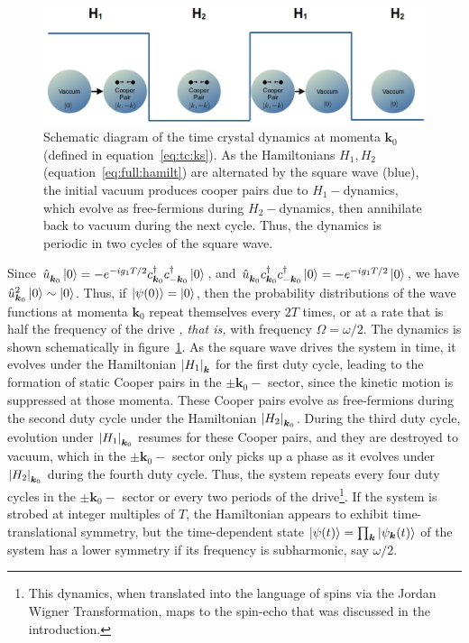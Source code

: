 \documentclass[preprint,5p,times,twocolumn]{elsarticle}
\newcommand{\bmk}{\bm{k}}
\begin{document}
\begin{figure}[t!]
    \centering
    \includegraphics[scale=3.5]{fig1_subharmonic.png}
    \caption{Schematic diagram of the time crystal dynamics at momenta $\bmk_0$ (defined in  equation~\ref{eq:tc:ks}). As the Hamiltonians $H_1, H_2$ (equation~\ref{eq:full:hamilt}) are alternated by the square wave (blue), the initial vacuum produces cooper pairs due to $H_1-$dynamics, which evolve as free-fermions during $H_2-$dynamics, then annihilate back to vacuum during the next cycle. Thus, the dynamics is periodic in two cycles of the square wave.}
    \label{fig:scm:tc}
\end{figure}
Since $\hat{u}^{\;}_{\bmk_0}\ket{0} = -e^{-ig_1T/2} c^\dagger_{\bmk_0}c^\dagger_{-\bmk_0}\ket{0}$, and $\hat{u}^{\;}_{\bmk_0}c^\dagger_{\bmk_0}c^\dagger_{-\bmk_0}\ket{0} = -e^{-ig_1T/2}\ket{0}$, we have $\hat{u}^2_{\bmk_0}\ket{0}\sim\ket{0}$. Thus, if $\ket{\psi(0)}=\ket{0}$, then the probability distributions of the wave functions at momenta $\bmk_0$ repeat themselves every $2T$ times, or at a rate that is half the frequency of the drive \textit{, that is,} with frequency $\Omega = \omega/2$.  The dynamics is shown schematically in figure~\ref{fig:scm:tc}. As the square wave drives the system in time, it evolves under the Hamiltonian $\vqty{H_1}_{\bmk}$ for the first duty cycle, leading to the formation of static Cooper pairs in the $\pm\bmk_0-$ sector, since the kinetic motion is suppressed at those momenta. These Cooper pairs evolve as free-fermions during the second duty cycle under the Hamiltonian $\vqty{H_2}_{\bmk_0}$. During the third duty cycle, evolution under $\vqty{H_1}_{\bmk_0}$ resumes for these Cooper pairs, and they are destroyed to vacuum, which in the $\pm \bmk_0-$ sector only picks up a phase as it evolves under $\vqty{H_2}_{\bmk_0}$ during the fourth duty cycle. Thus, the system repeats every four duty cycles in the $\pm \bmk_0-$ sector or every two periods of the drive\footnote{This dynamics, when translated into the language of spins via the Jordan Wigner Transformation, maps to the spin-echo that was discussed in the introduction.}. If the system is strobed at integer multiples of $T$, the Hamiltonian appears to exhibit time-translational symmetry, but the time-dependent state $\ket{\psi(t)} = \prod_{\bmk}\ket{\psi_{\bmk}(t)}$ of the system has a lower symmetry if its frequency is subharmonic, say $\omega/2$. 
\end{document}
